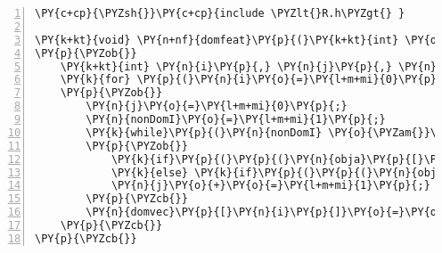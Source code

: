 \begin{Verbatim}[commandchars=\\\{\},codes={\catcode`\$=3\catcode`\^=7\catcode`\_=8},gobble=0,numbers=left,fontfamily=fvm,fontshape=n,fontsize=\footnotesize,tabsize=2]
\PY{c+cp}{\PYZsh{}}\PY{c+cp}{include \PYZlt{}R.h\PYZgt{} }

\PY{k+kt}{void} \PY{n+nf}{domfeat}\PY{p}{(}\PY{k+kt}{int} \PY{o}{*}\PY{n}{n}\PY{p}{,} \PY{k+kt}{double} \PY{o}{*}\PY{n}{obja}\PY{p}{,} \PY{k+kt}{double} \PY{o}{*}\PY{n}{objb}\PY{p}{,} \PY{k+kt}{int} \PY{o}{*}\PY{n}{domvec}\PY{p}{)}
\PY{p}{\PYZob{}}
	\PY{k+kt}{int} \PY{n}{i}\PY{p}{,} \PY{n}{j}\PY{p}{,} \PY{n}{nonDomI}\PY{p}{;}
	\PY{k}{for} \PY{p}{(}\PY{n}{i}\PY{o}{=}\PY{l+m+mi}{0}\PY{p}{;} \PY{n}{i}\PY{o}{\PYZlt{}}\PY{o}{*}\PY{n}{n}\PY{p}{;} \PY{n}{i}\PY{o}{+}\PY{o}{+}\PY{p}{)}
	\PY{p}{\PYZob{}}
		\PY{n}{j}\PY{o}{=}\PY{l+m+mi}{0}\PY{p}{;}
		\PY{n}{nonDomI}\PY{o}{=}\PY{l+m+mi}{1}\PY{p}{;}
		\PY{k}{while}\PY{p}{(}\PY{n}{nonDomI} \PY{o}{\PYZam{}}\PY{o}{\PYZam{}} \PY{n}{j}\PY{o}{\PYZlt{}}\PY{o}{*}\PY{n}{n}\PY{p}{)}
		\PY{p}{\PYZob{}}
			\PY{k}{if}\PY{p}{(}\PY{p}{(}\PY{n}{obja}\PY{p}{[}\PY{n}{i}\PY{p}{]}\PY{o}{\PYZlt{}}\PY{n}{obja}\PY{p}{[}\PY{n}{j}\PY{p}{]}\PY{p}{)} \PY{o}{\PYZam{}}\PY{o}{\PYZam{}} \PY{p}{(}\PY{n}{objb}\PY{p}{[}\PY{n}{i}\PY{p}{]}\PY{o}{\PYZlt{}}\PY{o}{=}\PY{n}{objb}\PY{p}{[}\PY{n}{j}\PY{p}{]}\PY{p}{)}\PY{p}{)} \PY{n}{nonDomI}\PY{o}{=}\PY{l+m+mi}{0}\PY{p}{;}
			\PY{k}{else} \PY{k}{if}\PY{p}{(}\PY{p}{(}\PY{n}{objb}\PY{p}{[}\PY{n}{i}\PY{p}{]}\PY{o}{\PYZlt{}}\PY{n}{objb}\PY{p}{[}\PY{n}{j}\PY{p}{]}\PY{p}{)} \PY{o}{\PYZam{}}\PY{o}{\PYZam{}} \PY{p}{(}\PY{n}{obja}\PY{p}{[}\PY{n}{i}\PY{p}{]}\PY{o}{\PYZlt{}}\PY{o}{=}\PY{n}{obja}\PY{p}{[}\PY{n}{j}\PY{p}{]}\PY{p}{)}\PY{p}{)} \PY{n}{nonDomI}\PY{o}{=}\PY{l+m+mi}{0}\PY{p}{;}
			\PY{n}{j}\PY{o}{+}\PY{o}{=}\PY{l+m+mi}{1}\PY{p}{;}
		\PY{p}{\PYZcb{}}
		\PY{n}{domvec}\PY{p}{[}\PY{n}{i}\PY{p}{]}\PY{o}{=}\PY{o}{\PYZhy{}}\PY{n}{nonDomI}\PY{o}{+}\PY{l+m+mi}{1}\PY{p}{;}
	\PY{p}{\PYZcb{}}
\PY{p}{\PYZcb{}}
\end{Verbatim}
